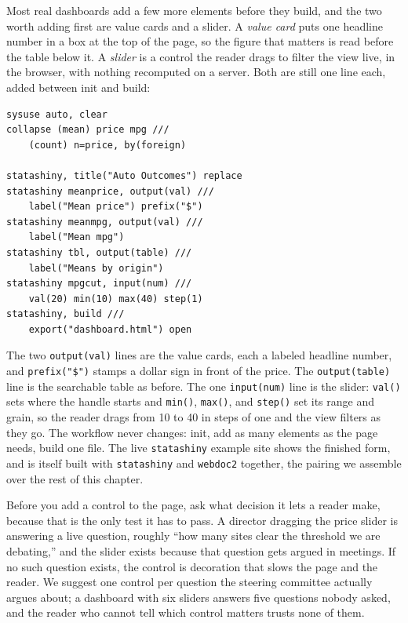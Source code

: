 \documentclass[
    a4paper,
    fontsize=10pt,
    twoside=true,
    numbers=noenddot,
]{kaobook}
\begin{document}
Most real dashboards add a few more elements before they build, and the two worth adding first are value cards and a slider. A \emph{value card} puts one headline number in a box at the top of the page, so the figure that matters is read before the table below it. A \emph{slider} is a control the reader drags to filter the view live, in the browser, with nothing recomputed on a server. Both are still one line each, added between init and build:
\par
{\footnotesize
\begin{verbatim}
sysuse auto, clear
collapse (mean) price mpg ///
    (count) n=price, by(foreign)

statashiny, title("Auto Outcomes") replace
statashiny meanprice, output(val) ///
    label("Mean price") prefix("$")
statashiny meanmpg, output(val) ///
    label("Mean mpg")
statashiny tbl, output(table) ///
    label("Means by origin")
statashiny mpgcut, input(num) ///
    val(20) min(10) max(40) step(1)
statashiny, build ///
    export("dashboard.html") open
\end{verbatim}
}
The two \texttt{output(val)} lines are the value cards, each a labeled headline number, and \texttt{prefix("\$")} stamps a dollar sign in front of the price. The \texttt{output(table)} line is the searchable table as before. The one \texttt{input(num)} line is the slider: \texttt{val()} sets where the handle starts and \texttt{min()}, \texttt{max()}, and \texttt{step()} set its range and grain, so the reader drags from 10 to 40 in steps of one and the view filters as they go. The workflow never changes: init, add as many elements as the page needs, build one file. The live \texttt{statashiny} example site shows the finished form, and is itself built with \texttt{statashiny} and \texttt{webdoc2} together, the pairing we assemble over the rest of this chapter.

Before you add a control to the page, ask what decision it lets a reader make, because that is the only test it has to pass. A director dragging the price slider is answering a live question, roughly \enquote{how many sites clear the threshold we are debating,} and the slider exists because that question gets argued in meetings. If no such question exists, the control is decoration that slows the page and the reader. We suggest one control per question the steering committee actually argues about; a dashboard with six sliders answers five questions nobody asked, and the reader who cannot tell which control matters trusts none of them.
\end{document}
